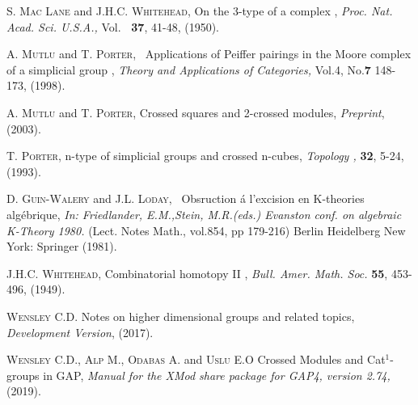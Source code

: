 \documentclass[a4paper,11pt]{article}
\theoremstyle{plain}
\theoremstyle{definition}
\begin{document}
\begin{thebibliography}{99}
	 \textsc{S. Mac Lane} and \textsc{J.H.C. Whitehead}, \textrm{On
		the 3-type of a complex }, \emph{Proc. Nat. Acad. Sci. U.S.A.,} Vol. \textbf{%
		\ 37}, 41-48, (1950).
	
	 \textsc{A. Mutlu} and \textsc{T. Porter}, \textrm{\
		Applications of Peiffer pairings in the Moore complex of a simplicial group}
	, \emph{Theory and Applications of Categories, } Vol.4, No.\textbf{7}
	148-173, (1998).
	
	 \textsc{A. Mutlu} and \textsc{T. Porter}, \textrm{Crossed
		squares and 2-crossed modules}, \emph{Preprint}, (2003).
	
	 \textsc{T. Porter}, \textrm{n-type of simplicial groups and
		crossed n-cubes}, \emph{Topology ,} \textbf{32}, 5-24, (1993).
	
	 \textsc{D. Guin-Walery} and \textsc{J.L. Loday}, \textrm{\
		Obsruction {\'{a}} l'excision en K-theories alg{\'{e}}brique, } \emph{In:
		Friedlander, E.M.,Stein, M.R.(eds.) Evanston conf. on algebraic K-Theory
		1980.} (Lect. Notes Math., vol.854, pp 179-216) Berlin Heidelberg New York:
	Springer (1981).
	
	 \textsc{J.H.C. Whitehead}, \textrm{Combinatorial homotopy
		II }, \emph{Bull. Amer. Math. Soc.} \textbf{55}, 453-496, (1949).
	
	\bibitem{wensley_notes} \textsc{Wensley C.D.} Notes on higher dimensional
	groups and related topics, \emph{Development Version}, (2017).
	
	 \textsc{Wensley C.D., Alp M., Odabas A.} and \textsc{Uslu E.O }
	Crossed Modules and Cat$^{1}$-groups in \textsf{GAP}, 
	    \emph{Manual for the \textsf{XMod} share package for \textsf{GAP4}, 
	    version 2.74,} (2019).
\end{thebibliography}
\end{document}
